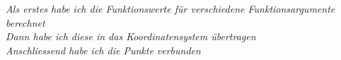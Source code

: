 \documentclass{article}
\begin{document}
\begin{minipage}[t]{.3\textwidth}
\raggedleft
\emph{Als erstes habe ich die Funktionswerte für verschiedene Funktionsargumente berechnet}\\[2cm]

\emph{\color{orange!80!black} Dann habe ich diese in das Koordinatensystem übertragen}\\[8cm]

\emph{Anschliessend habe ich die Punkte verbunden}\vspace{0.5cm}



\end{minipage}%



\newpage


\centering
\noindent{}
\end{document}
